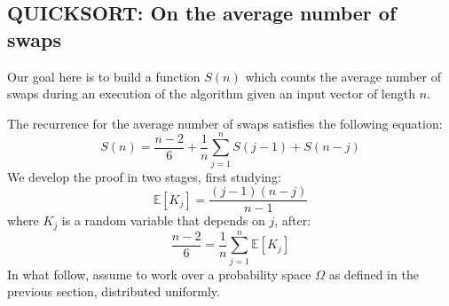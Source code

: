 \subsection{QUICKSORT: On the average number of swaps}
Our goal here is to build a function $S(n)$ which counts the average
number of swaps during an execution of the algorithm given an input
vector of length $n$.

The recurrence for the average number of swaps satisfies the following equation:
\begin{displaymath}
  S(n) =  \frac{n-2}{6} +  \frac{1}{n} \sum_{j=1}^{n}{S(j-1) + S(n-j)}
\end{displaymath}
We develop the proof in two stages, first studying:
\begin{equation}
  \label{eq:quicksort-swaps-one}
  \mathbb{E} \left[K_j \right]  = \frac{(j-1)(n-j)}{n-1}
\end{equation}
where $K_j$ is a random variable that depends on $j$, after:
\begin{equation}
  \label{eq:quicksort-swaps-two}
  \frac{n-2}{6} = \frac{1}{n}\sum_{j=1}^{n}{ \mathbb{E} \left[K_j \right] }
\end{equation}
In what follow, assume to work over a probability space $\Omega$ as
defined in the previous section, distributed uniformly.

